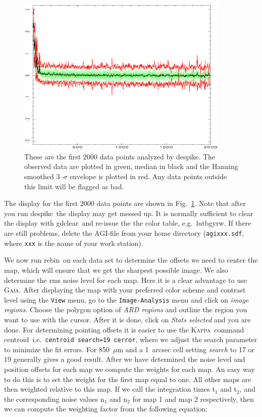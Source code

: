 \documentclass[twoside,11pt]{article}
\newcommand{\Kappa}{\xref{\textsc{Kappa}}{sun95}{}}
\newcommand{\gaia}{\xref{\textsc{Gaia}}{sun214}{}}
\newcommand{\agi}{\xref{AGI}{sun48}{}}
\newcommand{\task}[1]{\textsf{#1}}
\newcommand{\rebin}{\xref{\task{rebin}}{sun216}{REBIN}}
\newcommand{\desp}{\xref{\task{despike}}{sun216}{DESPIKE}}
\newcommand{\centroid}{\xref{\task{centroid}}{sun95}{CENTROID}}
\newcommand{\gdclear}{\xref{\task{gdclear}}{sun95}{GDCLEAR}}
\newcommand{\lutbgyrw}{\xref{\task{lutbgyrw}}{sun95}{LUTBGYRW}}
\newcommand{\xref}[3]{#1}
\renewcommand{\_}{\texttt{\symbol{95}}}
\begin{document}
\begin{figure}
\begin{center}
\includegraphics[width=4in]{sc11_fig7.eps}
\caption{These are the first 2000 data points analyzed by \desp. The
observed data are plotted in green, median in black and the Hanning
smoothed 3--$\sigma$ envelope is plotted in red. Any data points
outside this limit will be flagged as bad.}
\label{fig:desp}
\end{center}
\end{figure}


The display for the first 2000 data points are shown in Fig.\ \ref{fig:desp}.
Note that after you run \desp\ the display may get messed up.  It is normally
sufficient to clear the display with \gdclear\ and re-issue the the color
table, e.g.\ \lutbgyrw.  If there are still problems, delete the \agi-file
from your home directory (\texttt{agi\_xxx.sdf}, where \texttt{xxx} is the
name of your work station).


We now run \rebin\ on each data set to determine the offsets we need to center
the map, which will ensure that we get the sharpest possible image.  We also
determine the rms noise level for each map.  Here it is a clear advantage to
use \gaia.  After displaying the map with your preferred color scheme and
contrast level using the \texttt{View} menu, go to the \texttt{Image-Analysis}
menu and click on \textit{image regions}.  Choose the polygon option of
\textit{ARD regions} and outline the region you want to use with the cursor.
After it is done, click on \textit{Stats selected} and you are done.  For
determining pointing offsets it is easier to use the \Kappa\ command
\centroid\ i.e.\ \texttt{centroid search=19 cerror}, where we adjust the
search parameter to minimize the fit errors.  For 850~$\mu$m and a 1~arcsec
cell setting \textit{search} to 17 or 19 generally gives a good result.  After
we have determined the noise level and position offsets for each map we
compute the weights for each map.  An easy way to do this is to set the weight
for the first map equal to one.  All other maps are then weighted relative to
this map.  If we call the integration times t$_1$ and t$_2$, and the
corresponding noise values n$_1$ and n$_2$ for map 1 and map 2 respectively,
then we can compute the weighting factor from the following equation:
\end{document}
